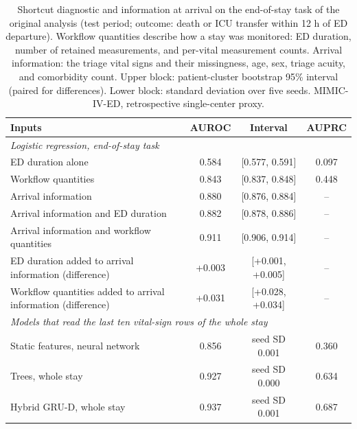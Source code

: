 \begin{table}[t]
\centering
\footnotesize
\caption{Shortcut diagnostic and information at arrival on the end-of-stay task of the original analysis (test period; outcome: death or ICU transfer within 12 h of ED departure). Workflow quantities describe how a stay was monitored: ED duration, number of retained measurements, and per-vital measurement counts. Arrival information: the triage vital signs and their missingness, age, sex, triage acuity, and comorbidity count. Upper block: patient-cluster bootstrap 95\% interval (paired for differences). Lower block: standard deviation over five seeds. MIMIC-IV-ED, retrospective single-center proxy.}
\label{tab:shortcuts}
\begin{tabular}{lccc}
\toprule
Inputs & AUROC & Interval & AUPRC \\
\midrule
\multicolumn{4}{l}{\emph{Logistic regression, end-of-stay task}} \\
ED duration alone & 0.584 & [0.577, 0.591] & 0.097 \\
Workflow quantities & 0.843 & [0.837, 0.848] & 0.448 \\
Arrival information & 0.880 & [0.876, 0.884] & -- \\
Arrival information and ED duration & 0.882 & [0.878, 0.886] & -- \\
Arrival information and workflow quantities & 0.911 & [0.906, 0.914] & -- \\
ED duration added to arrival information (difference) & +0.003 & [+0.001, +0.005] & -- \\
Workflow quantities added to arrival information (difference) & +0.031 & [+0.028, +0.034] & -- \\
\midrule
\multicolumn{4}{l}{\emph{Models that read the last ten vital-sign rows of the whole stay}} \\
Static features, neural network & 0.856 & seed SD 0.001 & 0.360 \\
Trees, whole stay & 0.927 & seed SD 0.000 & 0.634 \\
Hybrid GRU-D, whole stay & 0.937 & seed SD 0.001 & 0.687 \\
\bottomrule
\end{tabular}
\end{table}
